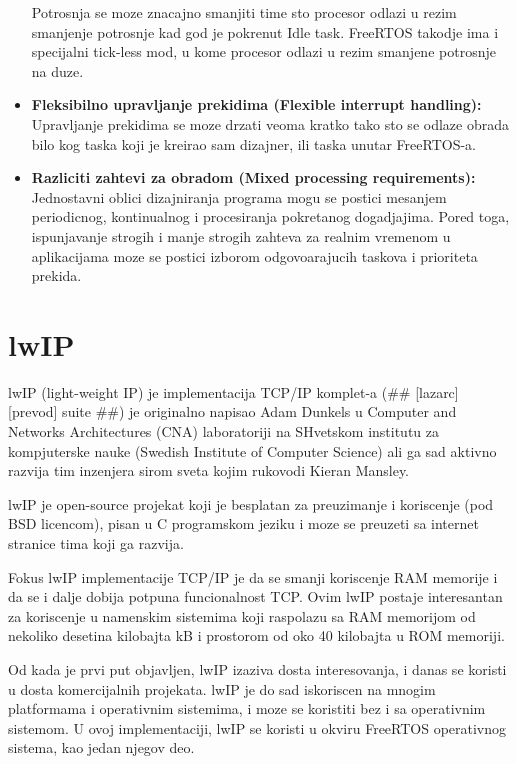 \documentclass[a4paper,12pt, master]{etf}
\begin{document}
\begin{itemize}
		Potrosnja se moze znacajno smanjiti time sto procesor odlazi u rezim smanjenje potrosnje
		kad god je pokrenut Idle task. FreeRTOS takodje ima i specijalni tick-less mod, u kome
		procesor odlazi u rezim smanjene potrosnje na duze.
		\item \textbf{Fleksibilno upravljanje prekidima (Flexible interrupt handling):}
		Upravljanje prekidima se moze drzati veoma kratko tako sto se odlaze obrada bilo kog taska
		koji je kreirao sam dizajner, ili taska unutar FreeRTOS-a.
		\item \textbf{Razliciti zahtevi za obradom (Mixed processing requirements):}
		Jednostavni oblici dizajniranja programa mogu se postici mesanjem periodicnog, kontinualnog
		i procesiranja pokretanog dogadjajima. Pored toga, ispunjavanje strogih i manje strogih
		zahteva za realnim vremenom u aplikacijama moze se postici izborom odgovoarajucih taskova i
		prioriteta prekida.

	\end{itemize}

	\section{lwIP}

	lwIP (light-weight IP) je implementacija TCP/IP komplet-a (\#\# [lazarc] [prevod] suite \#\#) je
	originalno napisao Adam Dunkels u Computer and Networks Architectures (CNA) laboratoriji na
	SHvetskom institutu za kompjuterske nauke (Swedish Institute of Computer Science) ali ga sad
	aktivno razvija tim inzenjera sirom sveta kojim rukovodi Kieran Mansley.

	lwIP je open-source projekat koji je besplatan za preuzimanje i koriscenje (pod BSD licencom),
	pisan u C programskom jeziku i moze se preuzeti sa internet stranice tima koji ga razvija.

	Fokus lwIP implementacije TCP/IP je da se smanji koriscenje RAM memorije i da se i dalje dobija
	potpuna funcionalnost TCP. Ovim lwIP postaje interesantan za koriscenje u namenskim sistemima
	koji raspolazu sa RAM memorijom od nekoliko desetina kilobajta kB i prostorom od oko 40
	kilobajta u ROM memoriji.

	Od kada je prvi put objavljen, lwIP izaziva dosta interesovanja, i danas se koristi u dosta
	komercijalnih projekata. lwIP je do sad iskoriscen na mnogim platformama i operativnim
	sistemima, i moze se koristiti bez i sa operativnim sistemom. U ovoj implementaciji, lwIP se
	koristi u okviru FreeRTOS operativnog sistema, kao jedan njegov deo.
\end{document}
